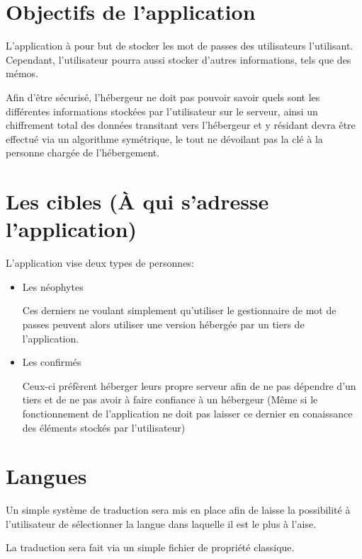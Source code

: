 \documentclass[oneside]{report}
\begin{document}
	\section{Objectifs de l'application}
	{
		\par L'application à pour but de stocker les mot de passes des utilisateurs l'utilisant. Cependant, l'utilisateur pourra aussi stocker d'autres informations, tels que des mémos.
		\vspace{.5cm}
		\par Afin d'être sécurisé, l'hébergeur ne doit pas pouvoir savoir quels sont les différentes informations stockées par l'utilisateur sur le serveur, ainsi un chiffrement total des données transitant vers l'hébergeur et y résidant devra être effectué via un algorithme symétrique, le tout ne dévoilant pas la clé à la personne chargée de l'hébergement.
	}

	\section{Les cibles (À qui s'adresse l'application)}
	{
		\par L'application vise deux types de personnes:
		\begin{itemize}
			\item Les néophytes \par Ces derniers ne voulant simplement qu'utiliser le gestionnaire de mot de passes peuvent alors utiliser une version hébergée par un tiers de l'application.
			\item Les confirmés \par Ceux-ci préfèrent héberger leurs propre serveur afin de ne pas dépendre d'un tiers et de ne pas avoir à faire confiance à un hébergeur (Même si le fonctionnement de l'application ne doit pas laisser ce dernier en conaissance des éléments stockés par l'utilisateur)
		\end{itemize}
	}

	\section{Langues}
	{
		\par Un simple système de traduction sera mis en place afin de laisse la possibilité à l'utilisateur de sélectionner la langue dans laquelle il est le plus à l'aise.
		\par La traduction sera fait via un simple fichier de propriété classique.
	}
\end{document}
